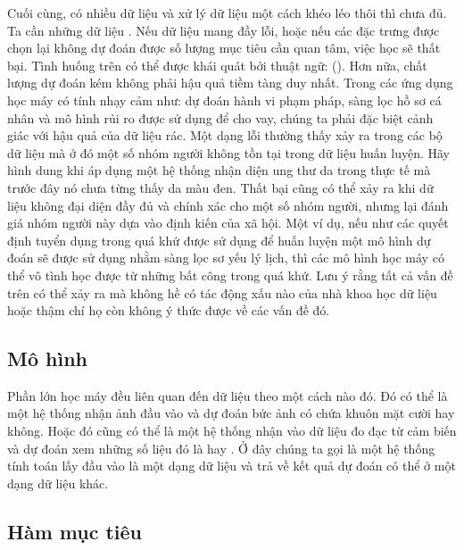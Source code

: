 \documentclass[letterpaper,11pt,english]{sphinxmanual}
\begin{document}
Cuối cùng, có nhiều dữ liệu và xử lý dữ liệu một cách khéo léo thôi thì
chưa đủ. Ta cần những dữ liệu . Nếu dữ liệu mang đầy lỗi, hoặc nếu
các đặc trưng được chọn lại không dự đoán được số lượng mục tiêu cần
quan tâm, việc học sẽ thất bại. Tình huống trên có thể được khái quát
bởi thuật ngữ:  (). Hơn nữa, chất lượng dự đoán kém không phải hậu quả tiềm tàng duy
nhất. Trong các ứng dụng học máy có tính nhạy cảm như: dự đoán hành vi
phạm pháp, sàng lọc hồ sơ cá nhân và mô hình rủi ro được sử dụng để cho
vay, chúng ta phải đặc biệt cảnh giác với hậu quả của dữ liệu rác. Một
dạng lỗi thường thấy xảy ra trong các bộ dữ liệu mà ở đó một số nhóm
người không tồn tại trong dữ liệu huấn luyện. Hãy hình dung khi áp dụng
một hệ thống nhận diện ung thư da trong thực tế mà trước đây nó chưa
từng thấy da màu đen. Thất bại cũng có thể xảy ra khi dữ liệu không đại
diện đầy đủ và chính xác cho một số nhóm người, nhưng lại đánh giá nhóm
người này dựa vào định kiến của xã hội. Một ví dụ, nếu như các quyết
định tuyển dụng trong quá khứ được sử dụng để huấn luyện một mô hình dự
đoán sẽ được sử dụng nhằm sàng lọc sơ yếu lý lịch, thì các mô hình học
máy có thể vô tình học được từ những bất công trong quá khứ. Lưu ý rằng
tất cả vấn đề trên có thể xảy ra mà không hề có tác động xấu nào của nhà
khoa học dữ liệu hoặc thậm chí họ còn không ý thức được về các vấn đề
đó.








\subsection{Mô hình}
\label{\detokenize{chapter_introduction/index_vn:mo-hinh}}


Phần lớn học máy đều liên quan đến  dữ liệu theo một cách nào
đó. Đó có thể là một hệ thống nhận ảnh đầu vào và dự đoán bức ảnh có
chứa khuôn mặt cười hay không. Hoặc đó cũng có thể là một hệ thống nhận
vào dữ liệu đo đạc từ cảm biến và dự đoán xem những số liệu đó là  hay . Ở đây chúng ta gọi  là một hệ thống
tính toán lấy đầu vào là một dạng dữ liệu và trả về kết quả dự đoán có
thể ở một dạng dữ liệu khác.




\subsection{Hàm mục tiêu}
\label{\detokenize{chapter_introduction/index_vn:ham-muc-tieu}}
\end{document}
